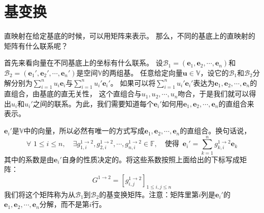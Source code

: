 \documentclass[12pt,UTF8,fontset=none]{ctexbook}
\begin{document}
\section{基变换}
直映射在给定基底的时候，可以用矩阵来表示。
那么，不同的基底上的直映射的矩阵有什么联系呢？

首先来看向量在不同基底上的坐标有什么联系。
设$\mathcal{B}_1 = (\mathbf{e}_1, \mathbf{e}_2, \cdots, \mathbf{e}_n)$和$\mathcal{B}_2= (\mathbf{e}_1', \mathbf{e}_2', \cdots, \mathbf{e}_n')$是空间$\mathbb{V}$的两组基。
任意给定向量$\mathbf{u} \in \mathbb{V}$，设它的$\mathcal{B}_1$和$\mathcal{B}_2$分解分别为$\sum_{i=1}^n u_i\mathbf{e}_i $与$\sum_{i=1}^n u_i'\mathbf{e}_i' $。
如果可以将$\sum_{i=1}^n u_i'\mathbf{e}_i' $表达为$\mathbf{e}_1, \mathbf{e}_2, \cdots, \mathbf{e}_n$的直组合，由基底的直无关性，
这个直组合与$u_1, u_2, \cdots, u_n$吻合，于是我们就可以得出$u_i$和$u_i'$之间的联系。为此，我们需要知道每个$\mathbf{e}_i'$如何用$\mathbf{e}_1, \mathbf{e}_2, \cdots, \mathbf{e}_n$的直组合来表示。

$\mathbf{e}_i'$是$\mathbb{V}$中的向量，所以必然有唯一的方式写成$\mathbf{e}_1, \mathbf{e}_2, \cdots, \mathbf{e}_n$的直组合。换句话说，
$$ \forall \,\, 1 \leqslant i \leqslant n, \quad \exists g_{1, i}^{1\rightarrow 2}, g_{2, i}^{1\rightarrow 2} ,\cdots , g_{n, i}^{1\rightarrow 2} \in \mathbb{F}, \quad \mbox{使得} \,\,\, \mathbf{e}_i' = \sum_{k=1}^n g_{k,i}^{1\rightarrow 2} \mathbf{e}_k$$
其中的系数是由$\mathbf{e}_i'$自身的性质决定的。将这些系数按照上面给出的下标写成矩阵：
$$G^{1\rightarrow 2} = \left[g_{i,j}^{1\rightarrow 2}\right]_{1\leqslant i , j \leqslant n}$$
我们将这个矩阵称为从$\mathcal{B}_1$到$\mathcal{B}_2$的基变换矩阵。注意：矩阵里第$i$列是$\mathbf{e}_i'$的$\mathbf{e}_1, \mathbf{e}_2, \cdots, \mathbf{e}_n$分解，而不是第$i$行。
\end{document}
